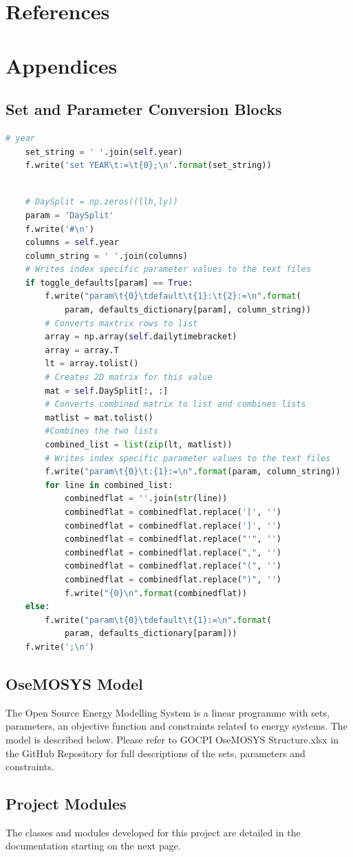 \documentclass[12pt]{article}
\begin{document}
\section{References}
\printbibliography
\newpage
\section{Appendices}
\subsection{Set and Parameter Conversion Blocks}\label{CB}
\begin{lstlisting}[language=Python,label = {lst:ODSPGCB},caption = {One Dimensional Set Python to GNU Mathprog Conversion Block}]
	# year
	set_string = ' '.join(self.year)
	f.write('set YEAR\t:=\t{0};\n'.format(set_string))
\end{lstlisting}
\begin{lstlisting}[language=Python,label = {lst:TDCPGCB},caption = Two Dimensional Parameter Python to GNU Mathprog Conversion Block]

	# DaySplit = np.zeros((llh,ly))
	param = 'DaySplit'
	f.write('#\n')
	columns = self.year
	column_string = ' '.join(columns)
	# Writes index specific parameter values to the text files
	if toggle_defaults[param] == True:
		f.write("param\t{0}\tdefault\t{1}:\t{2}:=\n".format(
			param, defaults_dictionary[param], column_string))
		# Converts maxtrix rows to list
		array = np.array(self.dailytimebracket)
		array = array.T
		lt = array.tolist()
		# Creates 2D matrix for this value
		mat = self.DaySplit[:, :]
		# Converts combined matrix to list and combines lists
		matlist = mat.tolist()
		#Combines the two lists
		combined_list = list(zip(lt, matlist))
		# Writes index specific parameter values to the text files
		f.write("param\t{0}\t:{1}:=\n".format(param, column_string))
		for line in combined_list:
			combinedflat = ''.join(str(line))
			combinedflat = combinedflat.replace('[', '')
			combinedflat = combinedflat.replace(']', '')
			combinedflat = combinedflat.replace("'", '')
			combinedflat = combinedflat.replace(",", '')
			combinedflat = combinedflat.replace("(", '')
			combinedflat = combinedflat.replace(")", '')
			f.write("{0}\n".format(combinedflat))
	else:
		f.write("param\t{0}\tdefault\t{1}:=\n".format(
			param, defaults_dictionary[param]))
	f.write(';\n')
\end{lstlisting}
\newpage
\subsection{OseMOSYS Model} \label{OM}
The Open Source Energy Modelling System is a linear programme with sets, parameters, an objective function and constraints related to energy systems.
The model is described below. Please refer to GOCPI OseMOSYS Structure.xlsx in the GitHub Repository for full descriptions of the sets, parameters and constraints.

\subsection{Project Modules}\label{Docstring}
The classes and modules developed for this project are detailed in the documentation starting on the next page.
\newpage

\newpage
\end{document}
